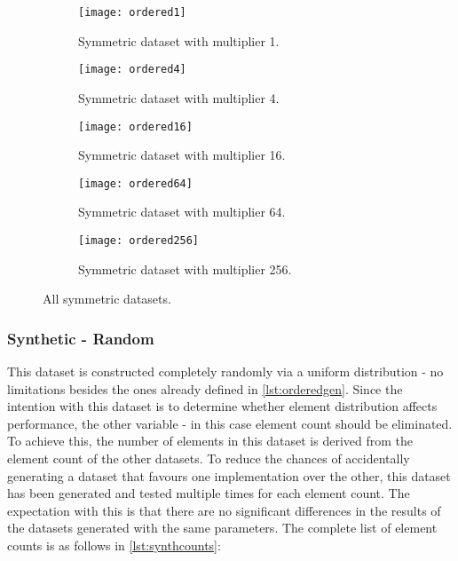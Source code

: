 \begin{figure}[H]
    \centering
    \begin{subfigure}{0.458\textwidth}
        \texttt{[image: ordered1]}
        \caption[Symmetric dataset with multiplier 1.]{Symmetric dataset with multiplier 1.}
        \label{fig:ordered1}
    \end{subfigure}
    \hfill
    \begin{subfigure}{0.458\textwidth}
        \texttt{[image: ordered4]}
        \caption[Symmetric dataset with multiplier 4.]{Symmetric dataset with multiplier 4.}
        \label{fig:ordered4}
    \end{subfigure}
    \hfill
    \begin{subfigure}{0.458\textwidth}
        \texttt{[image: ordered16]}
        \caption[Symmetric dataset with multiplier 16.]{Symmetric dataset with multiplier 16.}
        \label{fig:ordered16}
    \end{subfigure}\hfill
    \begin{subfigure}{0.458\textwidth}
        \texttt{[image: ordered64]}
        \caption[Symmetric dataset with multiplier 64.]{Symmetric dataset with multiplier 64.}
        \label{fig:ordered64}
    \end{subfigure}\hfill
    \begin{subfigure}{0.458\textwidth}
        \texttt{[image: ordered256]}
        \caption[Symmetric dataset with multiplier 256.]{Symmetric dataset with multiplier 256.}
        \label{fig:ordered256}
    \end{subfigure}
    \caption[All symmetric datasets.]{All symmetric datasets.}
    \label{fig:ordered}  
\end{figure}

\subsubsection{Synthetic - Random}
\label{subsubs:random}

This dataset is constructed completely randomly via a uniform distribution - no limitations besides the ones already defined in \autoref{lst:orderedgen}. Since the intention with this dataset is to determine whether element distribution affects performance, the other variable - in this case element count should be eliminated. To achieve this, the number of elements in this dataset is derived from the element count of the other datasets. To reduce the chances of accidentally generating a dataset that favours one implementation over the other, this dataset has been generated and tested multiple times for each element count. The expectation with this is that there are no significant differences in the results of the datasets generated with the same parameters. The complete list of element counts is as follows in \autoref{lst:synthcounts}:

